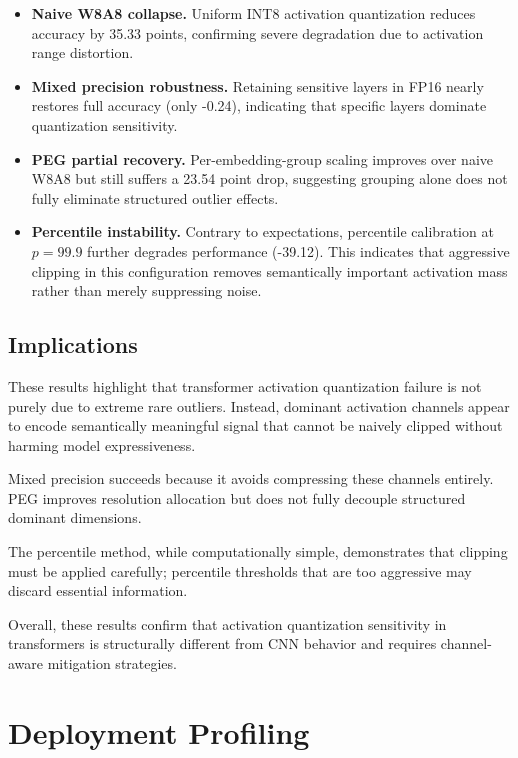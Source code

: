 \documentclass[conference]{IEEEtran}
\begin{document}
\begin{itemize}
\item \textbf{Naive W8A8 collapse.} Uniform INT8 activation quantization reduces accuracy by 35.33 points, confirming severe degradation due to activation range distortion.
\item \textbf{Mixed precision robustness.} Retaining sensitive layers in FP16 nearly restores full accuracy (only -0.24), indicating that specific layers dominate quantization sensitivity.
\item \textbf{PEG partial recovery.} Per-embedding-group scaling improves over naive W8A8 but still suffers a 23.54 point drop, suggesting grouping alone does not fully eliminate structured outlier effects.
\item \textbf{Percentile instability.} Contrary to expectations, percentile calibration at $p=99.9$ further degrades performance (-39.12). This indicates that aggressive clipping in this configuration removes semantically important activation mass rather than merely suppressing noise.
\end{itemize}

\subsection{Implications}

These results highlight that transformer activation quantization failure is not purely due to extreme rare outliers. Instead, dominant activation channels appear to encode semantically meaningful signal that cannot be naively clipped without harming model expressiveness.

Mixed precision succeeds because it avoids compressing these channels entirely. PEG improves resolution allocation but does not fully decouple structured dominant dimensions.

The percentile method, while computationally simple, demonstrates that clipping must be applied carefully; percentile thresholds that are too aggressive may discard essential information.

Overall, these results confirm that activation quantization sensitivity in transformers is structurally different from CNN behavior and requires channel-aware mitigation strategies.

\section{Deployment Profiling}
\end{document}
